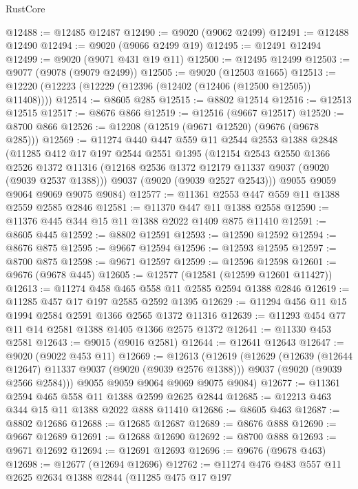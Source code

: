 \begin{lexlean}{RustCore}
\begin{coremodule}
@12488 := @12485 @12487
@12490 := @9020 (@9062 @2499)
@12491 := @12488 @12490
@12494 := @9020 (@9066 @2499 @19)
@12495 := @12491 @12494
@12499 := @9020 (@9071 @431 @19 @11)
@12500 := @12495 @12499
@12503 := @9077 (@9078 (@9079 @2499))
@12505 := @9020 (@12503 @1665)
@12513 := @12220 (@12223 (@12229 (@12396 (@12402 (@12406 (@12500 @12505)) @11408))))
@12514 := @8605 @285
@12515 := @8802 @12514
@12516 := @12513 @12515
@12517 := @8676 @866
@12519 := @12516 (@9667 @12517)
@12520 := @8700 @866
@12526 := @12208 (@12519 (@9671 @12520) (@9676 (@9678 @285)))
@12569 := @11274
    @440
    @447
    @559
    @11
    @2544
    @2553
    @1388
    @2848
    (@11285
      @412
      @17
      @197
      @2544
      @2551
      @1395
      (@12154
        @2543
        @2550
        @1366
        @2526
        @1372
        @11316
        (@12168 @2536 @1372 @12179 @11337 @9037 (@9020 (@9039 @2537 @1388)))
        @9037
        (@9020 (@9039 @2527 @2543)))
      @9055
      @9059
      @9064
      @9069
      @9075
      @9084)
@12577 := @11361 @2553 @447 @559 @11 @1388 @2559 @2585 @2846
@12581 := @11370 @447 @11 @1388 @2558
@12590 := @11376 @445 @344 @15 @11 @1388 @2022 @1409 @875 @11410
@12591 := @8605 @445
@12592 := @8802 @12591
@12593 := @12590 @12592
@12594 := @8676 @875
@12595 := @9667 @12594
@12596 := @12593 @12595
@12597 := @8700 @875
@12598 := @9671 @12597
@12599 := @12596 @12598
@12601 := @9676 (@9678 @445)
@12605 := @12577 (@12581 (@12599 @12601 @11427))
@12613 := @11274 @458 @465 @558 @11 @2585 @2594 @1388 @2846
@12619 := @11285 @457 @17 @197 @2585 @2592 @1395
@12629 := @11294 @456 @11 @15 @1994 @2584 @2591 @1366 @2565 @1372 @11316
@12639 := @11293 @454 @77 @11 @14 @2581 @1388 @1405 @1366 @2575 @1372
@12641 := @11330 @453 @2581
@12643 := @9015 (@9016 @2581)
@12644 := @12641 @12643
@12647 := @9020 (@9022 @453 @11)
@12669 := @12613
    (@12619
      (@12629
        (@12639 (@12644 @12647) @11337 @9037 (@9020 (@9039 @2576 @1388)))
        @9037
        (@9020 (@9039 @2566 @2584)))
      @9055
      @9059
      @9064
      @9069
      @9075
      @9084)
@12677 := @11361 @2594 @465 @558 @11 @1388 @2599 @2625 @2844
@12685 := @12213 @463 @344 @15 @11 @1388 @2022 @888 @11410
@12686 := @8605 @463
@12687 := @8802 @12686
@12688 := @12685 @12687
@12689 := @8676 @888
@12690 := @9667 @12689
@12691 := @12688 @12690
@12692 := @8700 @888
@12693 := @9671 @12692
@12694 := @12691 @12693
@12696 := @9676 (@9678 @463)
@12698 := @12677 (@12694 @12696)
@12762 := @11274
    @476
    @483
    @557
    @11
    @2625
    @2634
    @1388
    @2844
    (@11285
      @475
      @17
      @197

\end{coremodule}
\end{lexlean}
